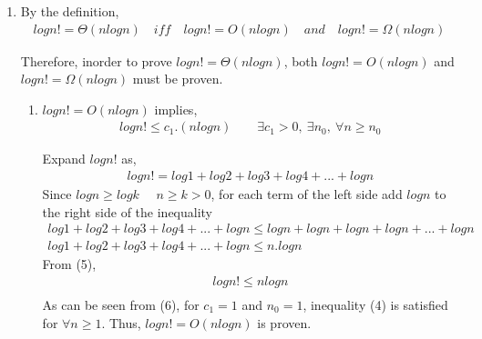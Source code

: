 \documentclass[11pt]{article}
\begin{document}
\renewcommand{\theenumi}{\alph{enumi}}
\begin{enumerate}
	
	\item
    By the definition, 
	\begin{equation*}
	\begin{split}
	  logn! = \Theta(nlogn) \quad iff \quad logn! = O(nlogn) \quad and \quad logn! = \Omega(nlogn)
	\end{split}
	\end{equation*}

	Therefore, inorder to prove $logn! = \Theta(nlogn)$, both $ logn! = O(nlogn)$ and $ logn! = \Omega(nlogn)$ must be proven.
	
	\renewcommand{\theenumii}{\roman{enumii}}
	\begin{enumerate}
	 \item
	 $ logn! = O(nlogn)$ implies,
	 \begin{equation}
	 \begin{split}
	 logn! \leq c_1.(nlogn)   \quad \quad \exists c_1>0,\ \exists n_0, \ \forall n \geq n_0
	 \end{split}
	 \end{equation}
	 
	 Expand $logn!$ as,
	 \begin{equation}
	 \begin{split}
	 logn! = log1 + log2 + log3 + log4 + ... + logn
	 \end{split}
	 \end{equation}
	 Since $logn \geq logk$  $\quad n \geq k>0$, for each term of the left side add $logn$ to the right side of the inequality
	 \begin{equation*}
	 \begin{split}
	  log1 + log2 + log3 + log4 + ... + logn \leq logn + logn + logn + logn +...+ logn\\
	  log1 + log2 + log3 + log4 + ... + logn \leq n.logn \quad \quad \quad \quad \quad \quad
	 \end{split}
	 \end{equation*}
	 From (5),
	 \begin{equation}
	 \begin{split}
	 logn! \leq nlogn \\
	 \end{split}
	 \end{equation}
	 As can be seen from (6), for $c_1 = 1$ and $n_0 = 1$,  inequality (4) is satisfied for $\forall n \geq 1$. Thus, $ logn! = O(nlogn)$ is proven.\\
	 

\end{enumerate}
\end{enumerate}
\end{document}
